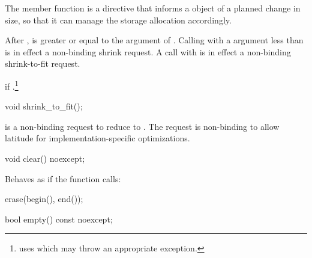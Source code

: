 \begin{itemdescr}
\pnum
The member function
is a directive that informs a
object of a planned change in size,
so that it can manage the storage allocation accordingly.

\pnum
\effects
After
,
is greater or equal to the argument of
.
\enternote
Calling
with a  argument less than
is in effect a non-binding shrink request.
A call with
is in effect a non-binding shrink-to-fit request.
\exitnote

\pnum
\throws
{}
if
.\footnote{
uses
which may throw an appropriate exception.}
\end{itemdescr}

%
%
\begin{itemdecl}
void shrink_to_fit();
\end{itemdecl}

\begin{itemdescr}
\pnum
\notes {} is a non-binding request to reduce
 to . \enternote The request is non-binding to
allow latitude for implementation-specific optimizations. \exitnote
\end{itemdescr}

%
%
\begin{itemdecl}
void clear() noexcept;
\end{itemdecl}

\begin{itemdescr}
\pnum
\effects
Behaves as if the function calls:

\begin{codeblock}
erase(begin(), end());
\end{codeblock}
\end{itemdescr}

%
%
\begin{itemdecl}
bool empty() const noexcept;
\end{itemdecl}

